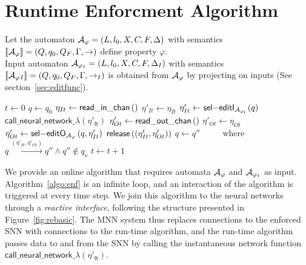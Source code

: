 \section{Runtime Enforcment Algorithm}
\label{sec:re-algorithm}

Let the automaton ${\mathcal A}_{\varphi}=\left(L, {l_0}, X,  C,  F,  \Delta \right)$ with semantics $[\!\left[{\mathcal A}_\varphi\right]\!]=\left( Q, q_0, Q_F, \Gamma, \to \right)$ define property $\varphi$.
\\ Input automaton ${\mathcal A}_{\varphi_I}=\left(L, {l_0}, X,  C,  F,  \Delta_I \right)$ with semantics $[\!\left[{\mathcal A}_\varphi{_I}\right]\!]=\left( Q, q_0, Q_F, \Gamma, \to_I \right)$ is obtained from ${\mathcal A}_{\varphi}$ by projecting on inputs (See section~\ref{sec:editfunc}).

\begin{algorithm}[ht]
	\caption{$\mathsf{Enforcer}$}
	\label{algo:enf}
	{
		\begin{algorithmic}[1]
			\STATE $t \gets 0$
			\STATE $q \gets q_{0}$
			\WHILE {$\true$}
				\STATE $\eta_{It} \gets \mathsf{read\_in\_chan}\left( \right)$
				\label{algoEi-begin}
					\label{algoEi-test}
					\STATE $\eta'_{It} \gets \eta_{It}$
				\ELSE
					\STATE $\eta'_{It} \gets \mathsf{{sel}\relax{-} editI_{{\mathcal A}_{\varphi_{I}}}}\left(q\right)$
				\ENDIF
				\label{algoEi-end}
				\STATE $\mathsf{call\_neural\_network\_\lambda\left(\eta'_{It}\right)}$
				\STATE $\eta'_{Ot} \gets \mathsf{read\_out\_chan}\left( \right)$
				\label{algoEo-begin}
					\label{algoEo-test}
					\STATE $\eta'_{Ot} \gets \eta_{Ot}$
				\ELSE
					\STATE $\eta'_{Ot} \gets \mathsf{{sel}\relax{-} editO_{{\mathcal A}_\varphi}}\left(q, \eta'_{It}\right)$
				\ENDIF
				\label{algoEo-end}
				\STATE $\mathsf{release}\left(\left(\eta'_{It}, \eta'_{Ot}\right)\right)$
				\label{algoEo-release}
				\STATE $q \gets q''$ ~~~~ {\footnotesize{where $q\xrightarrow{\left(\eta'_{It},\eta'_{Ot}\right)} q''\wedge q'' \not\in q_v $}}
				\label{algo-stateUpdate}
				\STATE $t \gets t+1$
			\ENDWHILE
		\end{algorithmic}
	}
\end{algorithm}

We provide an online algorithm that requires automata ${\mathcal A}_{\varphi}$ and ${\mathcal A}_{\varphi_I}$ as input.
Algorithm~\ref{algo:enf} is an infinite loop, and an interaction of the algorithm is triggered at every time step.
We join this algorithm to the neural networks through a \emph{reactive interface}, following the structure presented in Figure~\ref{fig:rebasic}.
The \ac{MNN} system thus replaces connections to the enforced \ac{SNN} with connections to the run-time algorithm, and the run-time algorithm passes data to and from the \ac{SNN} by calling the instantaneous network function  $\mathsf{call\_neural\_network\_\lambda\left(\eta'_{It}\right)}$.


